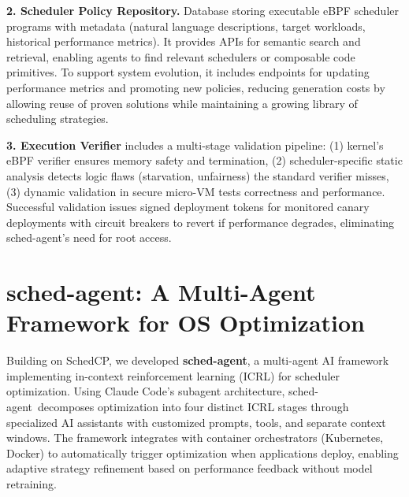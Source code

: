 \documentclass[preprint]{article}
\newcommand{\sys}{SchedCP\xspace}
\newcommand{\agent}{sched-agent\xspace}
\begin{document}
\textbf{2. Scheduler Policy Repository.} Database storing executable eBPF scheduler programs with metadata (natural language descriptions, target workloads, historical performance metrics). It provides APIs for semantic search and retrieval, enabling agents to find relevant schedulers or composable code primitives. To support system evolution, it includes endpoints for updating performance metrics and promoting new policies, reducing generation costs by allowing reuse of proven solutions while maintaining a growing library of scheduling strategies.


\textbf{3. Execution Verifier} includes a multi-stage validation pipeline: (1) kernel's eBPF verifier ensures memory safety and termination, (2) scheduler-specific static analysis detects logic flaws (starvation, unfairness) the standard verifier misses, (3) dynamic validation in secure micro-VM tests correctness and performance. Successful validation issues signed deployment tokens for monitored canary deployments with circuit breakers to revert if performance degrades, eliminating \agent's need for root access.

\section{\agent: A Multi-Agent Framework for OS Optimization}
\label{sec:sched_agents}

Building on \sys, we developed \textbf{\agent}, a multi-agent AI framework implementing in-context reinforcement learning (ICRL)\cite{incontextrl} for scheduler optimization. Using Claude Code's subagent architecture\cite{anthropic2024subagents}, \agent\ decomposes optimization into four distinct ICRL stages through specialized AI assistants with customized prompts, tools, and separate context windows\cite{anthropic2024multiagent}. The framework integrates with container orchestrators (Kubernetes, Docker) to automatically trigger optimization when applications deploy, enabling adaptive strategy refinement based on performance feedback without model retraining.
\end{document}
